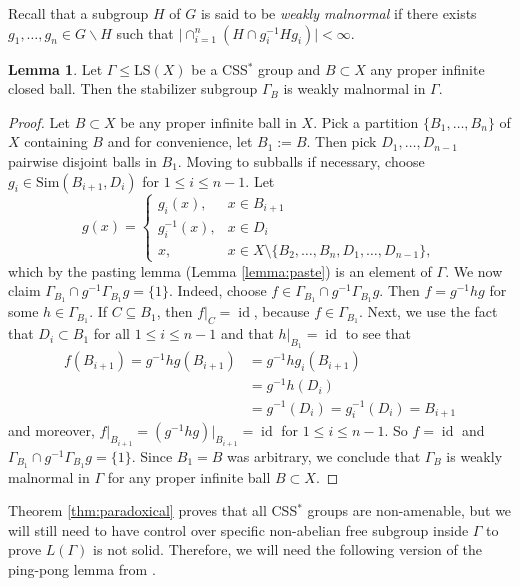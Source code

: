 \documentclass[12pt]{amsart}
\numberwithin{equation}{subsection}
\theoremstyle{definition}
\newtheorem{lemma}[theorem]{Lemma}
\theoremstyle{definition}
\theoremstyle{remark}
\begin{document}
Recall that a subgroup $H$ of $G$ is said to be \textit{weakly malnormal} if there exists $g_1, \dots, g_n \in G \backslash H$ such that $\vert\cap_{i=1}^{n} (H\cap g_i^{-1}Hg_i)\vert < \infty$. 


\begin{lemma}\label{lemma:wkmalnormal}
    Let $\Gamma \leq \text{LS}(X)$ be a CSS$^*$ group and $B \subset X$ any proper infinite closed ball. Then the stabilizer subgroup $\Gamma_B$ is weakly malnormal in $\Gamma$.
\end{lemma}

\begin{proof}
    Let $B \subset X$ be any proper infinite ball in $X$. Pick a partition $\{B_1, \dots, B_n \}$ of $X$ containing $B$ and for convenience, let $B_1 := B$. Then pick $D_1, \dots , D_{n-1}$ pairwise disjoint balls in $B_1$. Moving to subballs if necessary, choose $g_i \in \text{Sim}(B_{i+1}, D_i)$ for $1 \leq i \leq n-1$. Let
    \[ g(x) = \begin{cases}
        g_i(x), & x \in B_{i+1} \\
        g_i^{-1}(x), & x \in D_i \\
        x, & x \in X \setminus \{B_2, \dots, B_{n}, D_1, \dots, D_{n-1} \},
    \end{cases} \]
    which by the pasting lemma (Lemma \ref{lemma:paste}) is an element of $\Gamma$. We now claim $\Gamma_{B_1} \cap g^{-1}\Gamma_{B_1}g = \{ 1\}$. Indeed, choose $f \in \Gamma_{B_1} \cap g^{-1}\Gamma_{B_1}g$. Then $f=g^{-1}hg$ for some $h \in \Gamma_{B_1}$.  If $C \subseteq B_1$, then $f\vert_C = \operatorname{id}$, because $f \in \Gamma_{B_1}$. Next, we use the fact that $D_i \subset B_1$ for all $1 \leq i \leq n-1$ and that $h\vert_{B_1}= \operatorname{id}$ to see that
    \begin{align*}
        f(B_{i+1}) = g^{-1}hg(B_{i+1}) &= g^{-1}hg_i(B_{i+1}) \\
        &= g^{-1}h(D_i) \\
        &= g^{-1}(D_i) =g_i^{-1}(D_i) = B_{i+1}
    \end{align*}
    and moreover, $f\vert_{B_{i+1}} = (g^{-1}hg)\vert_{B_{i+1}} =\operatorname{id}$ for $1 \leq i \leq n-1$. So $f = \operatorname{id}$ and $\Gamma_{B_1} \cap g^{-1}\Gamma_{B_1}g = \{ 1\}$. Since $B_1 = B$ was arbitrary, we conclude that $\Gamma_B$ is weakly malnormal in $\Gamma$ for any proper infinite ball $B \subset X$.

\end{proof}


Theorem \ref{thm:paradoxical} proves that all CSS$^*$ groups are non-amenable, but we will still need to have control over specific non-abelian free subgroup inside $\Gamma$ to prove $L(\Gamma)$ is not solid. Therefore, we will need the following version of the ping-pong lemma from \cite{DrutuKapovich2018}. 
\end{document}
